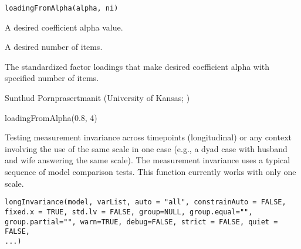 \documentclass[a4paper]{book}
\begin{document}
%
\begin{Usage}
\begin{verbatim}
loadingFromAlpha(alpha, ni)
\end{verbatim}
\end{Usage}
%
\begin{Arguments}
\begin{ldescription}
\item[\code{alpha}] A desired coefficient alpha value.
\item[\code{ni}] A desired number of items.
\end{ldescription}
\end{Arguments}
%
\begin{Value}
\begin{ldescription}
\item[\code{result}] The standardized factor loadings that make desired coefficient alpha with specified number of items.
\end{ldescription}
\end{Value}
%
\begin{Author}\relax
Sunthud Pornprasertmanit (University of Kansas; )
\end{Author}
%
\begin{Examples}
\begin{ExampleCode}
    loadingFromAlpha(0.8, 4)
\end{ExampleCode}
\end{Examples}
%
\begin{Description}\relax
Testing measurement invariance across timepoints (longitudinal) or any context involving the use of the same scale in one case (e.g., a dyad case with husband and wife answering the same scale). The measurement invariance uses a typical sequence of model comparison tests. This function currently works with only one scale.
\end{Description}
%
\begin{Usage}
\begin{verbatim}
longInvariance(model, varList, auto = "all", constrainAuto = FALSE, 
fixed.x = TRUE, std.lv = FALSE, group=NULL, group.equal="", 
group.partial="", warn=TRUE, debug=FALSE, strict = FALSE, quiet = FALSE, 
...)
\end{verbatim}
\end{Usage}
%
\end{document}
